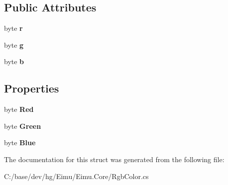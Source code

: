 \subsection*{Public Attributes}
\begin{DoxyCompactItemize}
\item 
\hypertarget{struct_eimu_1_1_core_1_1_rgb_color_a45d7cdb519ca38e7262d3f0bb2bc2a78}{
byte {\bfseries r}}
\label{struct_eimu_1_1_core_1_1_rgb_color_a45d7cdb519ca38e7262d3f0bb2bc2a78}

\item 
\hypertarget{struct_eimu_1_1_core_1_1_rgb_color_a3ddd3ca40b921a39051be5526d8754d6}{
byte {\bfseries g}}
\label{struct_eimu_1_1_core_1_1_rgb_color_a3ddd3ca40b921a39051be5526d8754d6}

\item 
\hypertarget{struct_eimu_1_1_core_1_1_rgb_color_a2575ebbce9e32fdb304deaa0fb320622}{
byte {\bfseries b}}
\label{struct_eimu_1_1_core_1_1_rgb_color_a2575ebbce9e32fdb304deaa0fb320622}

\end{DoxyCompactItemize}
\subsection*{Properties}
\begin{DoxyCompactItemize}
\item 
\hypertarget{struct_eimu_1_1_core_1_1_rgb_color_afd41fee1fa7fbe029cccdef86ec31396}{
byte {\bfseries Red}}
\label{struct_eimu_1_1_core_1_1_rgb_color_afd41fee1fa7fbe029cccdef86ec31396}

\item 
\hypertarget{struct_eimu_1_1_core_1_1_rgb_color_aea47f6a57f793c565c301fa76c06203e}{
byte {\bfseries Green}}
\label{struct_eimu_1_1_core_1_1_rgb_color_aea47f6a57f793c565c301fa76c06203e}

\item 
\hypertarget{struct_eimu_1_1_core_1_1_rgb_color_ae12d1e1527572373016f6900e1b44181}{
byte {\bfseries Blue}}
\label{struct_eimu_1_1_core_1_1_rgb_color_ae12d1e1527572373016f6900e1b44181}

\end{DoxyCompactItemize}


The documentation for this struct was generated from the following file:\begin{DoxyCompactItemize}
\item 
C:/base/dev/hg/Eimu/Eimu.Core/RgbColor.cs\end{DoxyCompactItemize}
